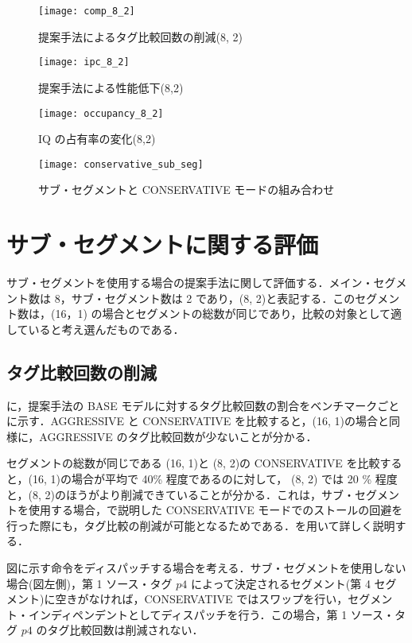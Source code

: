 \begin{figure}[htb]
  \centering
  \texttt{[image: comp\_8\_2]}
  \caption{提案手法によるタグ比較回数の削減(8, 2)}
  \label{fig:comp_8_2}
\end{figure}
\begin{figure}[htb]
  \centering
  \texttt{[image: ipc\_8\_2]}
  \caption{提案手法による性能低下(8,2)}
  \label{fig:ipc_8_2}
\end{figure}
\begin{figure}[htb]
  \centering
  \texttt{[image: occupancy\_8\_2]}
  \caption{IQ の占有率の変化(8,2)}
  \label{fig:occupancy_8_2}
\end{figure}
\begin{figure}[htb]
  \centering
  \texttt{[image: conservative\_sub\_seg]}
  \caption{サブ・セグメントと CONSERVATIVE モードの組み合わせ}
  \label{fig:conservative_sub_seg}
\end{figure}

\section{サブ・セグメントに関する評価}
サブ・セグメントを使用する場合の提案手法に関して評価する．メイン・セグメント数は 8，サブ・セグメント数は 2 であり，(8, 2)と表記する．このセグメント数は，(16，1) の場合とセグメントの総数が同じであり，比較の対象として適していると考え選んだものである．

\subsection{タグ比較回数の削減}
に，提案手法の BASE モデルに対するタグ比較回数の割合をベンチマークごとに示す．AGGRESSIVE と CONSERVATIVE を比較すると，(16, 1)の場合と同様に，AGGRESSIVE のタグ比較回数が少ないことが分かる．

セグメントの総数が同じである (16, 1)と (8, 2)の CONSERVATIVE を比較すると，(16, 1)の場合が平均で 40\% 程度であるのに対して， (8, 2) では 20 \% 程度と，(8, 2)のほうがより削減できていることが分かる．これは，サブ・セグメントを使用する場合，で説明した CONSERVATIVE モードでのストールの回避を行った際にも，タグ比較の削減が可能となるためである．を用いて詳しく説明する．

図に示す命令をディスパッチする場合を考える．サブ・セグメントを使用しない場合(図左側)，第 1 ソース・タグ $p4$ によって決定されるセグメント(第 4 セグメント)に空きがなければ，CONSERVATIVE ではスワップを行い，セグメント・インディペンデントとしてディスパッチを行う．この場合，第 1 ソース・タグ $p4$ のタグ比較回数は削減されない．

